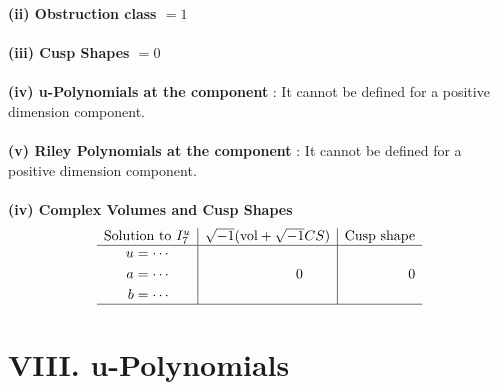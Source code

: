 \documentclass[1p]{elsarticle_modified}
\theoremstyle{definition}
\newcommand{\I}{\sqrt{-1}}
\begin{document}
\flushleft \textbf{(ii) Obstruction class $= 1$}\\~\\
\flushleft \textbf{(iii) Cusp Shapes $= 0$}\\~\\
\flushleft \textbf{(iv) u-Polynomials at the component} : It cannot be defined for a positive dimension component.\\~\\
\flushleft \textbf{(v) Riley Polynomials at the component} : It cannot be defined for a positive dimension component.\\~\\
\newpage\flushleft \textbf{(iv) Complex Volumes and Cusp Shapes}
$$\begin{array}{c|c|c} 
\text{Solution to }I^u_{7}& \I (\text{vol} + \sqrt{-1}CS) & \text{Cusp shape}\\
 \hline 
\begin{aligned}
u &= \cdots \\
a &= \cdots \\
b &= \cdots\end{aligned}
 & \phantom{-0.000000 } 0 & \phantom{-0.000000 } 0\\
 \hline 
 \end{array}
$$
\newpage\renewcommand{\arraystretch}{1}
\centering \section*{ VIII. u-Polynomials}
\end{document}

